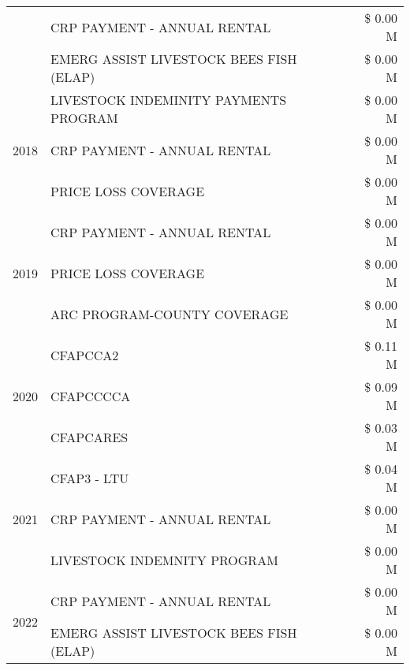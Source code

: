 \begin{tabular}{llr}
 & CRP PAYMENT - ANNUAL RENTAL & \$ 0.00 M \\
 & EMERG ASSIST LIVESTOCK BEES FISH (ELAP) & \$ 0.00 M \\
\cline{1-3}
\multirow[t]{3}{*}{2018} & LIVESTOCK INDEMINITY PAYMENTS PROGRAM & \$ 0.00 M \\
 & CRP PAYMENT - ANNUAL RENTAL & \$ 0.00 M \\
 & PRICE LOSS COVERAGE & \$ 0.00 M \\
\cline{1-3}
\multirow[t]{3}{*}{2019} & CRP PAYMENT - ANNUAL RENTAL & \$ 0.00 M \\
 & PRICE LOSS COVERAGE & \$ 0.00 M \\
 & ARC PROGRAM-COUNTY COVERAGE & \$ 0.00 M \\
\cline{1-3}
\multirow[t]{3}{*}{2020} & CFAPCCA2 & \$ 0.11 M \\
 & CFAPCCCCA & \$ 0.09 M \\
 & CFAPCARES & \$ 0.03 M \\
\cline{1-3}
\multirow[t]{3}{*}{2021} & CFAP3 - LTU & \$ 0.04 M \\
 & CRP PAYMENT - ANNUAL RENTAL & \$ 0.00 M \\
 & LIVESTOCK INDEMNITY PROGRAM & \$ 0.00 M \\
\cline{1-3}
\multirow[t]{2}{*}{2022} & CRP PAYMENT - ANNUAL RENTAL & \$ 0.00 M \\
 & EMERG ASSIST LIVESTOCK BEES FISH (ELAP) & \$ 0.00 M \\
\cline{1-3}
\bottomrule
\end{tabular}
